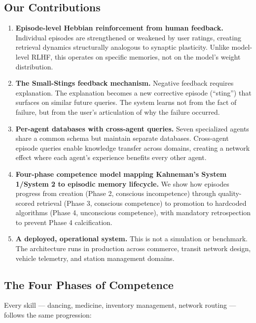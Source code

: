 \documentclass[11pt,a4paper]{article}
\begin{document}
\subsection{Our Contributions}

\begin{enumerate}
    \item \textbf{Episode-level Hebbian reinforcement from human feedback.} Individual episodes are strengthened or weakened by user ratings, creating retrieval dynamics structurally analogous to synaptic plasticity. Unlike model-level RLHF, this operates on specific memories, not on the model's weight distribution.

    \item \textbf{The Small-Stings feedback mechanism.} Negative feedback requires explanation. The explanation becomes a new corrective episode (``sting'') that surfaces on similar future queries. The system learns not from the fact of failure, but from the user's articulation of why the failure occurred.

    \item \textbf{Per-agent databases with cross-agent queries.} Seven specialized agents share a common schema but maintain separate databases. Cross-agent episode queries enable knowledge transfer across domains, creating a network effect where each agent's experience benefits every other agent.

    \item \textbf{Four-phase competence model mapping Kahneman's System 1/System 2 to episodic memory lifecycle.} We show how episodes progress from creation (Phase 2, conscious incompetence) through quality-scored retrieval (Phase 3, conscious competence) to promotion to hardcoded algorithms (Phase 4, unconscious competence), with mandatory retrospection to prevent Phase 4 calcification.

    \item \textbf{A deployed, operational system.} This is not a simulation or benchmark. The architecture runs in production across commerce, transit network design, vehicle telemetry, and station management domains.
\end{enumerate}

\subsection{The Four Phases of Competence}

Every skill --- dancing, medicine, inventory management, network routing --- follows the same progression:
\end{document}

